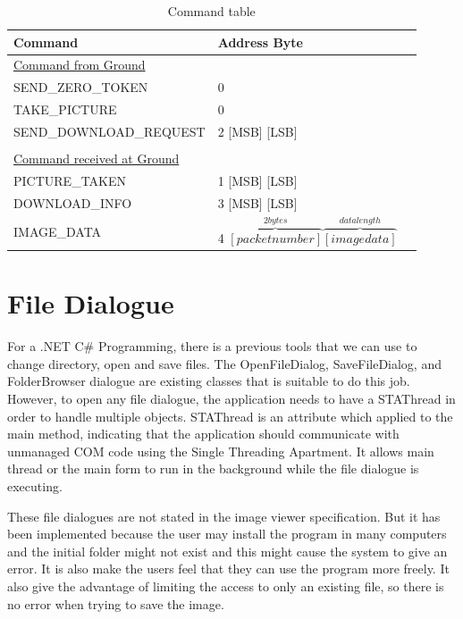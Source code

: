 \begin{table}[H]

\begin{center}
\begin{tabular}{l l @{.} l}
 Command&
\multicolumn{2}{l}{Address Byte } \\

\hline
\underline{Command from Ground} & \\
SEND\_ZERO\_TOKEN & 0 \\
TAKE\_PICTURE & 0 \\
SEND\_DOWNLOAD\_REQUEST & 2 [MSB] [LSB]  \\
\\
\underline{Command received at Ground}\\
PICTURE\_TAKEN & 1 [MSB] [LSB]\\
DOWNLOAD\_INFO & 3 [MSB] [LSB]\\
IMAGE\_DATA & 4 $\overbrace{ [packet number]}^{2bytes} \overbrace{[image data]}^{data length}$ \\
\end{tabular}
\caption{Command table\label{command_table}}
\end{center}
\end{table}

\section{File Dialogue}
For a .NET C\# Programming, there is a previous tools that we can use to change directory, open and save files. The OpenFileDialog,  SaveFileDialog, and FolderBrowser dialogue are existing classes that is suitable to do this job. However, to open any file dialogue, the application needs to have a STAThread in order to handle multiple objects. STAThread is an attribute which applied to the main method, indicating that the application should communicate with unmanaged COM code using the Single Threading Apartment. It allows main thread or the main form to run in the background while the file dialogue is executing. 

These file dialogues are not stated in the image viewer specification. But it has been implemented because the user may install the program in many computers and the initial folder might not exist and this might cause the system to give an error. It is also make the users feel that they can use the program more freely.  It also give the advantage of limiting the access to only an existing file, so there is no error when trying to save the image.

